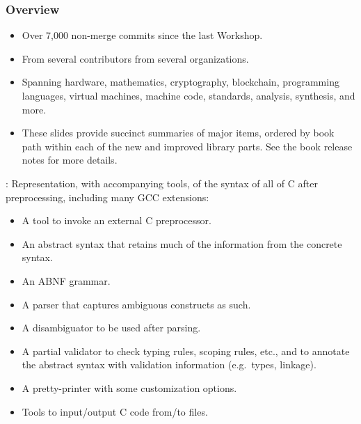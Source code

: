 \begin{frame}

\frametitle{Overview}

\begin{itemize}
\item Over 7,000 non-merge commits since the last Workshop.
\item From several contributors from several organizations.
\item Spanning hardware, mathematics, cryptography, blockchain,
      programming languages, virtual machines, machine code,
      standards, analysis, synthesis, and more.
\item These slides provide succinct summaries of major items,
      ordered by book path within each of the new and improved library parts.
      See the book release notes for more details.
\end{itemize}

\end{frame}


\begin{frame}

\newlibtitle

:
Representation, with accompanying tools,
of the syntax of all of C after preprocessing,
including many GCC extensions:
\begin{itemize}
\item A tool to invoke an external C preprocessor.
\item An abstract syntax that retains
      much of the information from the concrete syntax.
\item An ABNF grammar.
\item A parser that captures ambiguous constructs as such.
\item A disambiguator to be used after parsing.
\item A partial validator to check typing rules, scoping rules, etc.,
      and to annotate the abstract syntax with validation information
      (e.g.\ types, linkage).
\item A pretty-printer with some customization options.
\item Tools to input/output C code from/to files.
\end{itemize}

\end{frame}


